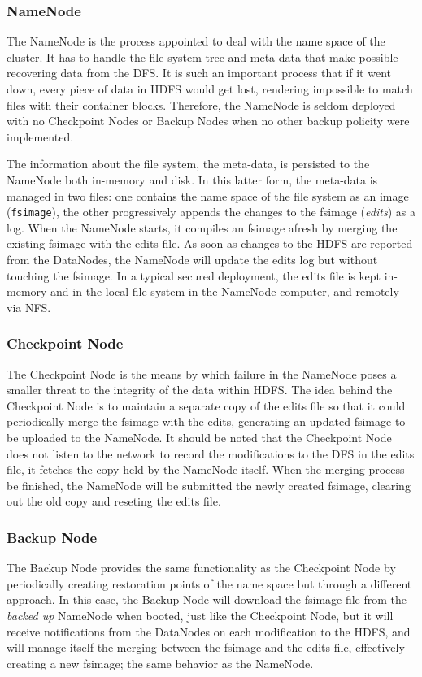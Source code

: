 \subsubsection{NameNode}\label{subsubsec:namenode}
\noindent The NameNode is the process appointed to deal with the name space of the cluster. It has to handle the file system tree and meta-data that make possible recovering data from the DFS. It is such an important process that if it went down, every piece of data in HDFS would get lost, rendering impossible to match files with their container blocks. Therefore, the NameNode is seldom deployed with no Checkpoint Nodes or Backup Nodes when no other backup policity were implemented.

The information about the file system, the meta-data, is persisted to the NameNode both in-memory and disk. In this latter form, the meta-data is managed in two files: one contains the name space of the file system as an image (\texttt{fsimage}), the other progressively appends the changes to the fsimage (\emph{edits}) as a log. When the NameNode starts, it compiles an fsimage afresh by merging the existing fsimage with the edits file. As soon as changes to the HDFS are reported from the DataNodes, the NameNode will update the edits log but without touching the fsimage. In a typical secured deployment, the edits file is kept in-memory and in the local file system in the NameNode computer, and remotely via NFS.

\subsubsection{Checkpoint Node}\label{subsubsec:checkpointnode}
\noindent The Checkpoint Node is the means by which failure in the NameNode poses a smaller threat to the integrity of the data within HDFS. The idea behind the Checkpoint Node is to maintain a separate copy of the edits file so that it could periodically merge the fsimage with the edits, generating an updated fsimage to be uploaded to the NameNode. It should be noted that the Checkpoint Node does not listen to the network to record the modifications to the DFS in the edits file, it fetches the copy held by the NameNode itself. When the merging process be finished, the NameNode will be submitted the newly created fsimage, clearing out the old copy and reseting the edits file.

\subsubsection{Backup Node}\label{subsubsec:backupnode}
\noindent The Backup Node provides the same functionality as the Checkpoint Node by periodically creating restoration points of the name space but through a different approach. In this case, the Backup Node will download the fsimage file from the \emph{backed up} NameNode when booted, just like the Checkpoint Node, but it will receive notifications from the DataNodes on each modification to the HDFS, and will manage itself the merging between the fsimage and the edits file, effectively creating a new fsimage; the same behavior as the NameNode.

